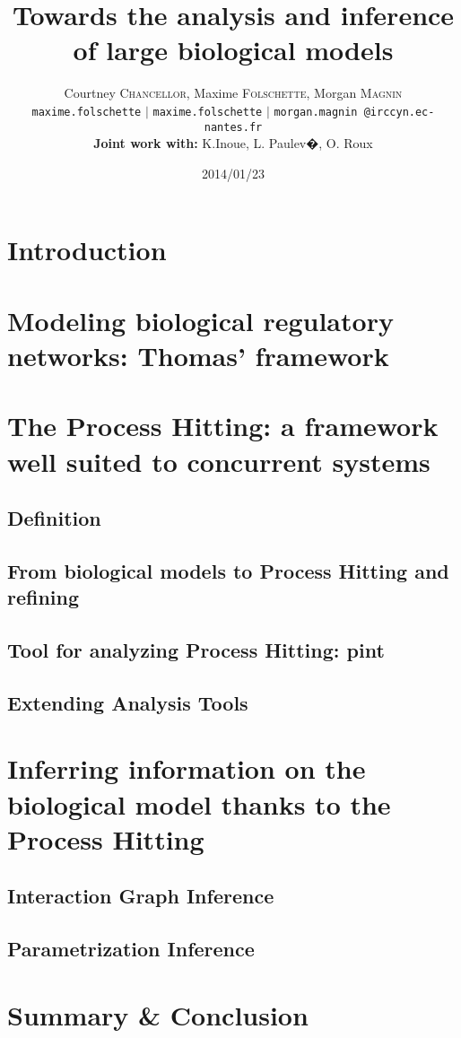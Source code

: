 \documentclass[hyperref,french,usenames,xcolor=dvipsnames]{beamer}
\title[BioSticker meeting]%
{\textbf{Towards the analysis and inference of large biological models} 
}
\author[C. \sc Chancellor, M. \sc Folschette, M. \sc Magnin]%
{Courtney \textsc{Chancellor}, Maxime \textsc{Folschette}, Morgan \textsc{Magnin} \\
\texttt{maxime.folschette} $\vert$ \texttt{maxime.folschette} $\vert$ \texttt{morgan.magnin @irccyn.ec-nantes.fr} \\
\textbf{Joint work with:} 
K.Inoue, L. Paulev�, O. Roux 
}
\institute[IRCCyN]{
\structure{
�cole Centrale de Nantes - IRCCyN -  \textit{MeForBio team} 
}

}
\date[2014/01/23]{2014/01/23}
\begin{document}
\frame{\titlepage}

\frame{\tableofcontents}



\section{Introduction}

\section{Modeling biological regulatory networks: Thomas' framework}


\section[Process Hitting]{The Process Hitting: a framework well suited to concurrent systems}
\subsection{Definition}

\subsection{From biological models to Process Hitting and refining}

\subsection{Tool for analyzing Process Hitting: pint}

\subsection{Extending Analysis Tools}

\section[Information inference]{Inferring information on the biological model thanks to the Process Hitting}

\subsection{Interaction Graph Inference}

\subsection{Parametrization Inference}

\section{Summary \& Conclusion}

\appendix



\end{document}
